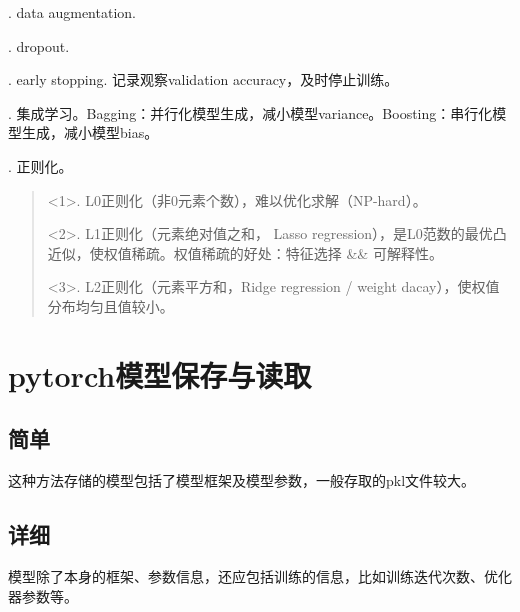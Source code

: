 \documentclass[letterpaper,10pt,english]{sphinxmanual}
\begin{document}
. data augmentation.

. dropout.

. early stopping. 记录观察validation accuracy，及时停止训练。

. 集成学习。Bagging：并行化模型生成，减小模型variance。Boosting：串行化模型生成，减小模型bias。

. 正则化。
\begin{quote}

\textless{}1\textgreater{}. L0正则化（非0元素个数），难以优化求解（NP-hard）。

\textless{}2\textgreater{}. L1正则化（元素绝对值之和， Lasso regression），是L0范数的最优凸近似，使权值稀疏。权值稀疏的好处：特征选择 \&\& 可解释性。

\textless{}3\textgreater{}. L2正则化（元素平方和，Ridge regression / weight dacay），使权值分布均匀且值较小。
\end{quote}


\section{pytorch模型保存与读取}
\label{\detokenize{deepLearning/05_modelSave:pytorch}}\label{\detokenize{deepLearning/05_modelSave::doc}}

\subsection{简单}
\label{\detokenize{deepLearning/05_modelSave:id1}}
%
\begin{sphinxVerbatim}[commandchars=\\\{\}]
 
 
  
\end{sphinxVerbatim}

这种方法存储的模型包括了模型框架及模型参数，一般存取的pkl文件较大。


\subsection{详细}
\label{\detokenize{deepLearning/05_modelSave:id2}}
模型除了本身的框架、参数信息，还应包括训练的信息，比如训练迭代次数、优化器参数等。
\end{document}
